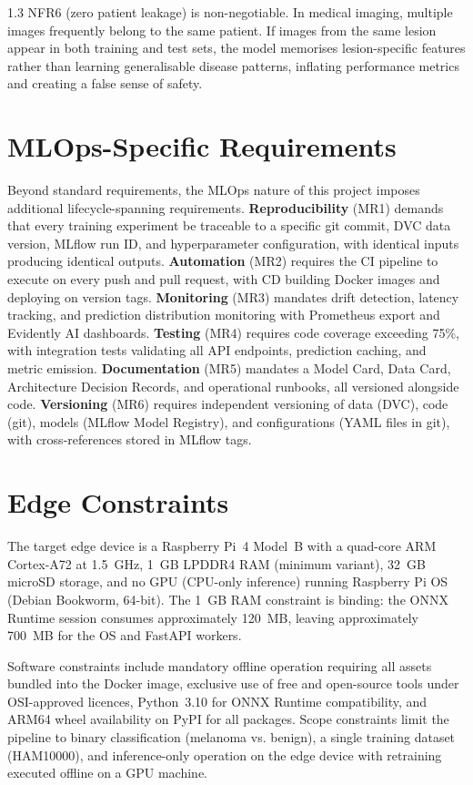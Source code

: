 \begin{spacing}{1.3}
NFR6 (zero patient leakage) is non-negotiable. In medical imaging, multiple images frequently belong to the same patient. If images from the same lesion appear in both training and test sets, the model memorises lesion-specific features rather than learning generalisable disease patterns, inflating performance metrics and creating a false sense of safety.

\section{MLOps-Specific Requirements}

Beyond standard requirements, the MLOps nature of this project imposes additional lifecycle-spanning requirements. \textbf{Reproducibility} (MR1) demands that every training experiment be traceable to a specific git commit, DVC data version, MLflow run ID, and hyperparameter configuration, with identical inputs producing identical outputs. \textbf{Automation} (MR2) requires the CI pipeline to execute on every push and pull request, with CD building Docker images and deploying on version tags. \textbf{Monitoring} (MR3) mandates drift detection, latency tracking, and prediction distribution monitoring with Prometheus export and Evidently AI dashboards. \textbf{Testing} (MR4) requires code coverage exceeding 75\%, with integration tests validating all API endpoints, prediction caching, and metric emission. \textbf{Documentation} (MR5) mandates a Model Card, Data Card, Architecture Decision Records, and operational runbooks, all versioned alongside code. \textbf{Versioning} (MR6) requires independent versioning of data (DVC), code (git), models (MLflow Model Registry), and configurations (YAML files in git), with cross-references stored in MLflow tags.

\section{Edge Constraints}

The target edge device is a Raspberry Pi~4 Model~B with a quad-core ARM Cortex-A72 at 1.5~GHz, 1~GB LPDDR4 RAM (minimum variant), 32~GB microSD storage, and no GPU (CPU-only inference) running Raspberry Pi OS (Debian Bookworm, 64-bit). The 1~GB RAM constraint is binding: the ONNX Runtime session consumes approximately 120~MB, leaving approximately 700~MB for the OS and FastAPI workers.

Software constraints include mandatory offline operation requiring all assets bundled into the Docker image, exclusive use of free and open-source tools under OSI-approved licences, Python~3.10 for ONNX Runtime compatibility, and ARM64 wheel availability on PyPI for all packages. Scope constraints limit the pipeline to binary classification (melanoma vs. benign), a single training dataset (HAM10000), and inference-only operation on the edge device with retraining executed offline on a GPU machine.

\end{spacing}
